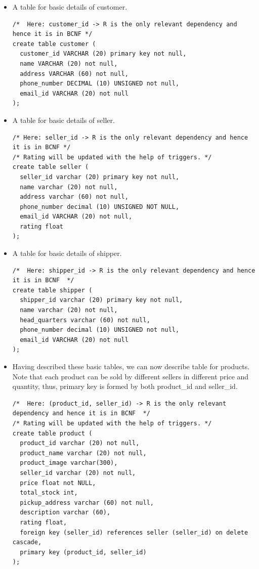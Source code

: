 \documentclass[a4paper,12pt]{article}
\begin{document}
\begin{itemize}
  \item A table for basic details of customer.
\begin{verbatim}
/*  Here: customer_id -> R is the only relevant dependency and hence it is in BCNF */
create table customer (
  customer_id VARCHAR (20) primary key not null,
  name VARCHAR (20) not null,
  address VARCHAR (60) not null,
  phone_number DECIMAL (10) UNSIGNED not null,
  email_id VARCHAR (20) not null
);
\end{verbatim}
  \item A table for basic details of seller.
  \begin{verbatim}
/* Here: seller_id -> R is the only relevant dependency and hence it is in BCNF */
/* Rating will be updated with the help of triggers. */
create table seller (
  seller_id varchar (20) primary key not null,
  name varchar (20) not null,
  address varchar (60) not null,
  phone_number decimal (10) UNSIGNED NOT NULL,
  email_id VARCHAR (20) not null,
  rating float
);
  \end{verbatim}
  \item A table for basic details of shipper.
  \begin{verbatim}
/*  Here: shipper_id -> R is the only relevant dependency and hence it is in BCNF  */
create table shipper (
  shipper_id varchar (20) primary key not null,
  name varchar (20) not null,
  head_quarters varchar (60) not null,
  phone_number decimal (10) UNSIGNED not null,
  email_id VARCHAR (20) not null
);

  \end{verbatim}
  \item Having described these basic tables, we can now describe table for products. Note that each product can be sold by different sellers in different price and quantity, thus, primary key is formed by both product\_id and seller\_id. 
  \begin{verbatim}
/*  Here: (product_id, seller_id) -> R is the only relevant dependency and hence it is in BCNF  */
/* Rating will be updated with the help of triggers. */
create table product (
  product_id varchar (20) not null,
  product_name varchar (20) not null,
  product_image varchar(300),
  seller_id varchar (20) not null,
  price float not NULL,
  total_stock int,
  pickup_address varchar (60) not null,
  description varchar (60),
  rating float,
  foreign key (seller_id) references seller (seller_id) on delete cascade,
  primary key (product_id, seller_id)
);


\end{verbatim}
\end{itemize}
\end{document}
